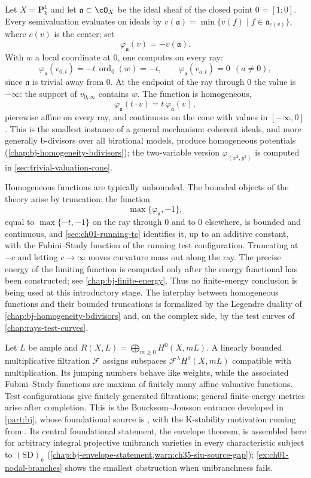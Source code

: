 \begin{example}
\label{ex:ch01-cone-ideal}
Let $X=\mathbf P^1_k$ and let $\mathfrak a\subset\cO_X$ be the ideal sheaf
of the closed point $0=[1:0]$.  Every semivaluation evaluates on ideals by
$v(\mathfrak a)=\min\{v(f)\mid f\in\mathfrak a_{c(v)}\}$, where $c(v)$ is
the center; set
\[
   \varphi_{\mathfrak a}(v)=-v(\mathfrak a).
\]
With $w$ a local coordinate at $0$, one computes on every ray:
\[
 \varphi_{\mathfrak a}(v_{0,t})=-t\,\operatorname{ord}_0(w)=-t,
 \qquad
 \varphi_{\mathfrak a}(v_{a,t})=0\ \ (a\neq0),
\]
since $\mathfrak a$ is trivial away from $0$.  At the endpoint of the ray
through $0$ the value is $-\infty$: the support of $v_{0,\infty}$ contains
$w$.  The function is homogeneous,
\[
 \varphi_{\mathfrak a}(t\cdot v)=t\,\varphi_{\mathfrak a}(v),
\]
piecewise affine on every ray, and continuous on the cone with values in
$[-\infty,0]$.  This is the smallest instance of a general mechanism:
coherent ideals, and more generally b-divisors over all birational models,
produce homogeneous potentials (\cref{chap:bj-homogeneity-bdivisors}); the
two-variable version $\varphi_{(x^2,y^3)}$ is computed in
\cref{sec:trivial-valuation-cone}.

Homogeneous functions are typically unbounded.  The bounded objects of the
theory arise by truncation: the function
\[
 \max\{\varphi_{\mathfrak a},-1\},
\]
equal to $\max\{-t,-1\}$ on the ray through $0$ and to $0$ elsewhere, is
bounded and continuous, and \cref{sec:ch01-running-tc} identifies it, up to
an additive constant, with the Fubini--Study function of the running test
configuration.  Truncating at $-c$ and letting $c\to\infty$ moves curvature
mass out along the ray.  The precise energy of the limiting function is
computed only after the energy functional has been constructed; see
\cref{chap:bj-finite-energy}.  Thus no finite-energy conclusion is being
used at this introductory stage.
The interplay between homogeneous functions and their bounded truncations
is formalized by the Legendre duality of
\cref{chap:bj-homogeneity-bdivisors} and, on the complex side, by the test
curves of \cref{chap:rays-test-curves}.
\end{example}

Let $L$ be ample and $R(X,L)=\bigoplus_{m\geq0}H^0(X,mL)$.  A linearly
bounded multiplicative filtration $\mathcal F$ assigns subspaces
$\mathcal F^\lambda H^0(X,mL)$
compatible with multiplication.  Its jumping numbers behave like weights,
while the associated Fubini--Study functions are maxima of finitely many
affine valuative functions.  Test configurations give finitely generated
filtrations; general finite-energy metrics arise after completion.  This is
the Boucksom--Jonsson entrance developed in \cref{part:bj}, whose
foundational source is \cite{BJ22}, with the K-stability motivation coming
from \cite{BHJ17,BJ20}.  Its central foundational statement, the envelope
theorem, is assembled here for arbitrary integral projective unibranch
varieties in every characteristic subject to $\mathrm{(SD)}_k$
(\cref{chap:bj-envelope-statement,warn:ch35-siu-source-gap}); \cref{ex:ch01-nodal-branches} shows the
smallest obstruction when unibranchness fails.

